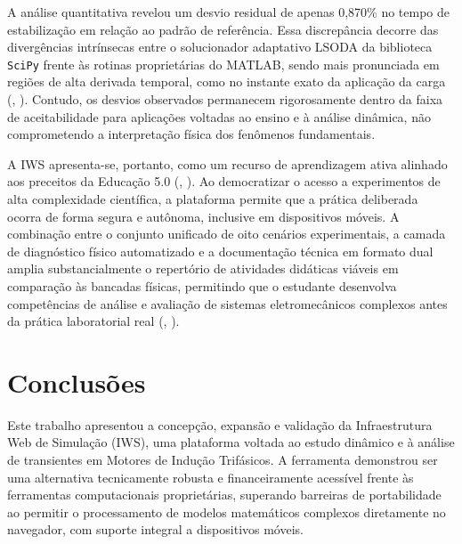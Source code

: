 \documentclass[a4paper]{ifacconf}
\begin{document}
A análise quantitativa revelou um desvio residual de apenas 0,870\% no tempo de estabilização em relação ao padrão de referência. Essa discrepância decorre das divergências intrínsecas entre o solucionador adaptativo LSODA da biblioteca \texttt{SciPy} frente às rotinas proprietárias do MATLAB, sendo mais pronunciada em regiões de alta derivada temporal, como no instante exato da aplicação da carga (\citeauthor{li2010simulation}, \citeyear{li2010simulation}). Contudo, os desvios observados permanecem rigorosamente dentro da faixa de aceitabilidade para aplicações voltadas ao ensino e à análise dinâmica, não comprometendo a interpretação física dos fenômenos fundamentais.

A IWS apresenta-se, portanto, como um recurso de aprendizagem ativa alinhado aos preceitos da Educação 5.0 (\citeauthor{cordeiro2024educacao}, \citeyear{cordeiro2024educacao}). Ao democratizar o acesso a experimentos de alta complexidade científica, a plataforma permite que a prática deliberada ocorra de forma segura e autônoma, inclusive em dispositivos móveis. A combinação entre o conjunto unificado de oito cenários experimentais, a camada de diagnóstico físico automatizado e a documentação técnica em formato dual amplia substancialmente o repertório de atividades didáticas viáveis em comparação às bancadas físicas, permitindo que o estudante desenvolva competências de análise e avaliação de sistemas eletromecânicos complexos antes da prática laboratorial real (\citeauthor{singh2019improving}, \citeyear{singh2019improving}).

\section{Conclusões}

Este trabalho apresentou a concepção, expansão e validação da Infraestrutura Web de Simulação (IWS), uma plataforma voltada ao estudo dinâmico e à análise de transientes em Motores de Indução Trifásicos. A ferramenta demonstrou ser uma alternativa tecnicamente robusta e financeiramente acessível frente às ferramentas computacionais proprietárias, superando barreiras de portabilidade ao permitir o processamento de modelos matemáticos complexos diretamente no navegador, com suporte integral a dispositivos móveis.
\end{document}
